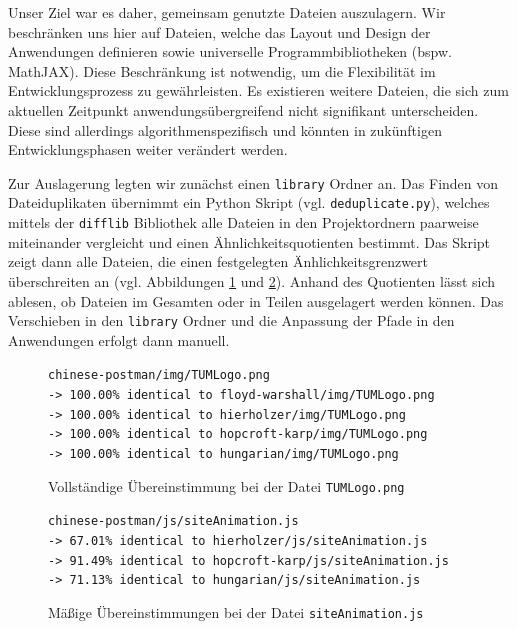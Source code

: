 Unser Ziel war es daher, gemeinsam genutzte Dateien auszulagern. Wir beschränken uns hier auf Dateien, welche das Layout und Design der Anwendungen definieren sowie universelle Programmbibliotheken (bspw. MathJAX). Diese Beschränkung ist notwendig, um die Flexibilität im Entwicklungsprozess zu gewährleisten. Es existieren weitere Dateien, die sich zum aktuellen Zeitpunkt anwendungsübergreifend nicht signifikant unterscheiden. Diese sind allerdings algorithmenspezifisch und könnten in zukünftigen Entwicklungsphasen weiter verändert werden.

Zur Auslagerung legten wir zunächst einen \texttt{library} Ordner an. Das Finden von Dateiduplikaten übernimmt ein Python Skript (vgl. \texttt{deduplicate.py}), welches mittels der \texttt{difflib} Bibliothek alle Dateien in den Projektordnern paarweise miteinander vergleicht und einen Ähnlichkeitsquotienten bestimmt. Das Skript zeigt dann alle Dateien, die einen festgelegten Änhlichkeitsgrenzwert überschreiten an (vgl. Abbildungen \ref{fig:shared-files-1} und \ref{fig:shared-files-2}). Anhand des Quotienten lässt sich ablesen, ob Dateien im Gesamten oder in Teilen ausgelagert werden können. Das Verschieben in den \texttt{library} Ordner und die Anpassung der Pfade in den Anwendungen erfolgt dann manuell.

\begin{figure}[h!]
\noindent\texttt{chinese-postman/img/TUMLogo.png \\
-> 100.00\% identical to floyd-warshall/img/TUMLogo.png \\
-> 100.00\% identical to hierholzer/img/TUMLogo.png \\
-> 100.00\% identical to hopcroft-karp/img/TUMLogo.png \\
-> 100.00\% identical to hungarian/img/TUMLogo.png
}
\caption[Gemeinsame Dateien, Beispiel 1]{Vollständige Übereinstimmung bei der Datei \texttt{TUMLogo.png}}\label{fig:shared-files-1}
\end{figure}

\begin{figure}[h!]
\noindent\texttt{chinese-postman/js/siteAnimation.js \\
-> 67.01\% identical to hierholzer/js/siteAnimation.js \\
-> 91.49\% identical to hopcroft-karp/js/siteAnimation.js \\
-> 71.13\% identical to hungarian/js/siteAnimation.js
}
\caption[Gemeinsame Dateien, Beispiel 2]{Mäßige Übereinstimmungen bei der Datei \texttt{siteAnimation.js}}\label{fig:shared-files-2}
\end{figure}

